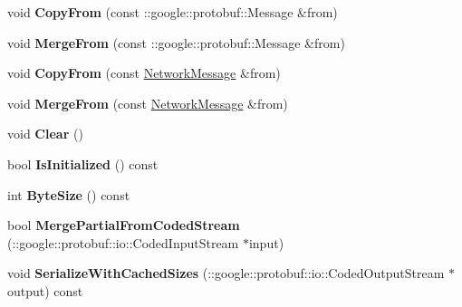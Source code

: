 \begin{DoxyCompactItemize}
\item 
\hypertarget{classSimpleChat_1_1NetworkMessage_a13212b0add820b37943801510adf68e6}{void {\bfseries Copy\-From} (const \-::google\-::protobuf\-::\-Message \&from)}\label{classSimpleChat_1_1NetworkMessage_a13212b0add820b37943801510adf68e6}

\item 
\hypertarget{classSimpleChat_1_1NetworkMessage_a4ebdf50d9a86c243fe00ba7b5f913a35}{void {\bfseries Merge\-From} (const \-::google\-::protobuf\-::\-Message \&from)}\label{classSimpleChat_1_1NetworkMessage_a4ebdf50d9a86c243fe00ba7b5f913a35}

\item 
\hypertarget{classSimpleChat_1_1NetworkMessage_a7fbc5949aaa3375591fc084407add520}{void {\bfseries Copy\-From} (const \hyperlink{classSimpleChat_1_1NetworkMessage}{Network\-Message} \&from)}\label{classSimpleChat_1_1NetworkMessage_a7fbc5949aaa3375591fc084407add520}

\item 
\hypertarget{classSimpleChat_1_1NetworkMessage_a6515a8b8adf203fd8bedb18db80b0e74}{void {\bfseries Merge\-From} (const \hyperlink{classSimpleChat_1_1NetworkMessage}{Network\-Message} \&from)}\label{classSimpleChat_1_1NetworkMessage_a6515a8b8adf203fd8bedb18db80b0e74}

\item 
\hypertarget{classSimpleChat_1_1NetworkMessage_afde8955d5b8daa35c399519b8a2c2f71}{void {\bfseries Clear} ()}\label{classSimpleChat_1_1NetworkMessage_afde8955d5b8daa35c399519b8a2c2f71}

\item 
\hypertarget{classSimpleChat_1_1NetworkMessage_afa900a259b82c3ea24e46ed98c5218c1}{bool {\bfseries Is\-Initialized} () const }\label{classSimpleChat_1_1NetworkMessage_afa900a259b82c3ea24e46ed98c5218c1}

\item 
\hypertarget{classSimpleChat_1_1NetworkMessage_a9245cbc44a5b79bab63bfc6abb599228}{int {\bfseries Byte\-Size} () const }\label{classSimpleChat_1_1NetworkMessage_a9245cbc44a5b79bab63bfc6abb599228}

\item 
\hypertarget{classSimpleChat_1_1NetworkMessage_a253f261555a96b562812625ed49678e1}{bool {\bfseries Merge\-Partial\-From\-Coded\-Stream} (\-::google\-::protobuf\-::io\-::\-Coded\-Input\-Stream $\ast$input)}\label{classSimpleChat_1_1NetworkMessage_a253f261555a96b562812625ed49678e1}

\item 
\hypertarget{classSimpleChat_1_1NetworkMessage_ab6b3953b6b07078c18ea42f7c81ba957}{void {\bfseries Serialize\-With\-Cached\-Sizes} (\-::google\-::protobuf\-::io\-::\-Coded\-Output\-Stream $\ast$output) const }\label{classSimpleChat_1_1NetworkMessage_ab6b3953b6b07078c18ea42f7c81ba957}


\end{DoxyCompactItemize}
